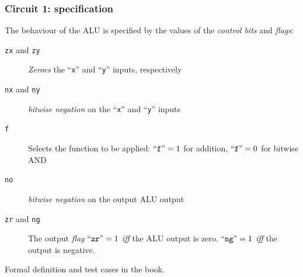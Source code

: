         \begin{frame}
            \frametitle{Circuit 1: specification}

            \par{The behaviour of the ALU is specified by the values of the \emph{control bits} and \emph{flags}:}

            \begin{description}
                \item[\texttt{zx} and \texttt{zy}]
                    \emph{Zeroes} the ``\texttt{x}'' and ``\texttt{y}'' inputs, respectively
                \item[\texttt{nx} and \texttt{ny}]
                    \emph{bitwise negation} on the ``\texttt{x}'' and ``\texttt{y}'' inputs
                \item[\texttt{f}]
                    Selects the function to be applied: \newline
                    $\text{``\texttt{f}''} = 1$ for addition, $\text{``\texttt{f}''} = 0$ for bitwise AND
                \item[\texttt{no}]
                    \emph{bitwise negation} on the output ALU output
                \item[\texttt{zr} and \texttt{ng}]
                    The output \emph{flag} $\text{``\texttt{zr}''} = 1$ \emph{iff} the ALU output is zero.
                    $\text{``\texttt{ng}''} = 1$ \emph{iff} the output is negative.
            \end{description}

            \vspace{0.3cm}
            \par{Formal definition and test cases in the book.}

        \end{frame}


